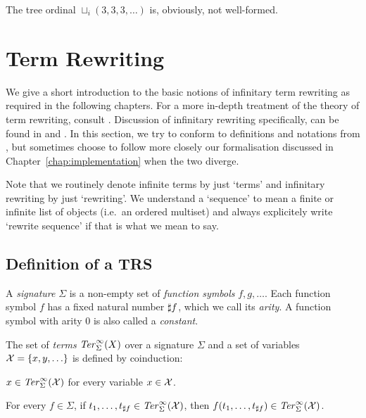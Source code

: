The tree ordinal $\sqcup_i (3, 3, 3, \ldots)$ is, obviously, not
well-formed.


\section{Term Rewriting}\label{sec:rewriting}

We give a short introduction to the basic notions of infinitary term
rewriting as required in the following chapters. For a more in-depth
treatment of the theory of term rewriting, consult
\citet{terese-03}. Discussion of infinitary rewriting specifically,
can be found in \citet[Chapter 12]{terese-03} and
\citet{klop-de-vrijer-05}. In this section, we try to conform to
definitions and notations from \citet{terese-03}, but sometimes choose
to follow more closely our \Coq formalisation discussed in
Chapter~\ref{chap:implementation} when the two diverge.

Note that we routinely denote infinite terms by just `terms' and infinitary
rewriting by just `rewriting'. We understand a `sequence' to mean a finite or
infinite list of objects (i.e.\ an ordered multiset) and always explicitely
write `rewrite sequence' if that is what we mean to say.


\subsection{Definition of a TRS}\label{sub:trs}

\begin{definition}%
A \emph{signature} $\Sigma$ is a non-empty set of \emph{function symbols} $f,
g, \ldots$. Each function symbol $f$ has a fixed natural number
$\sharp f$, which we call its \emph{arity}. A function symbol with
arity $0$ is also called a \emph{constant}.
\end{definition}

\begin{definition}%
The set of \emph{terms} $\mathit{Ter}_\Sigma^\infty(X)$ over a signature $\Sigma$ and a
set of variables $\mathcal{X} = \{x, y, \ldots\}$ is defined by coinduction:
\begin{compactenum}
  \item
    $x \in \mathit{Ter}_\Sigma^\infty(\mathcal{X})$ for every variable $x \in \mathcal{X}$.
  \item
    For every $f \in \Sigma$, if $t_1, \ldots, t_{\sharp f} \in
    \mathit{Ter}_\Sigma^\infty(\mathcal{X})$, then $f(t_1, \ldots, t_{\sharp f}) \in \mathit{Ter}_\Sigma^\infty(\mathcal{X})$.
\end{compactenum}
\end{definition}

